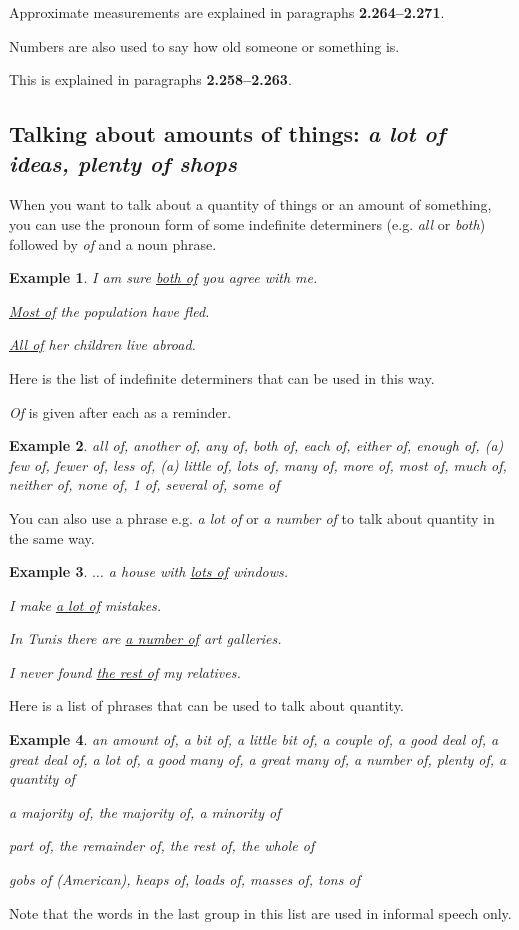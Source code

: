 \documentclass[oneside]{book}
\numberwithin{equation}{section}
\newtheorem{example}{Example}[section]
\begin{document}
Approximate measurements are explained in paragraphs \textbf{2.264--2.271}.

Numbers are also used to say how old someone or something is.

This is explained in paragraphs \textbf{2.258--2.263}.

\subsection{Talking about amounts of things: \textit{a lot of ideas, plenty of shops}}
\noindent{} When you want to talk about a quantity of things or an amount of something, you can use the pronoun form of some indefinite determiners (e.g. \textit{all} or \textit{both}) followed by \textit{of} and a noun phrase.
\begin{example}
    I am sure \underline{both of} you agree with me.
    
    \underline{Most of} the population have fled.
    
    \underline{All of} her children live abroad.
\end{example}
%
\noindent{} Here is the list of indefinite determiners that can be used in this way.

\textit{Of} is given after each as a reminder.
\begin{example}
    all of, another of, any of, both of, each of, either of, enough of, (a) few of, fewer of, less of, (a) little of, lots of, many of, more of, most of, much of, neither of, none of, 1 of, several of, some of
\end{example}
You can also use a phrase e.g. \textit{a lot of} or \textit{a number of} to talk about quantity in the same way.
\begin{example}
    $\ldots$ a house with \underline{lots of} windows.
    
    I make \underline{a lot of} mistakes.
    
    In Tunis there are \underline{a number of} art galleries.
    
    I never found \underline{the rest of} my relatives.
\end{example}
%
\noindent{} Here is a list of phrases that can be used to talk about quantity.
\begin{example}
    an amount of, a bit of, a little bit of, a couple of, a good deal of, a great deal of, a lot of, a good many of, a great many of, a number of, plenty of, a quantity of
    
    a majority of, the majority of, a minority of
    
    part of, the remainder of, the rest of, the whole of
    
    gobs of (\emph{American}), heaps of, loads of, masses of, tons of
\end{example}
Note that the words in the last group in this list are used in informal speech only.
\end{document}
